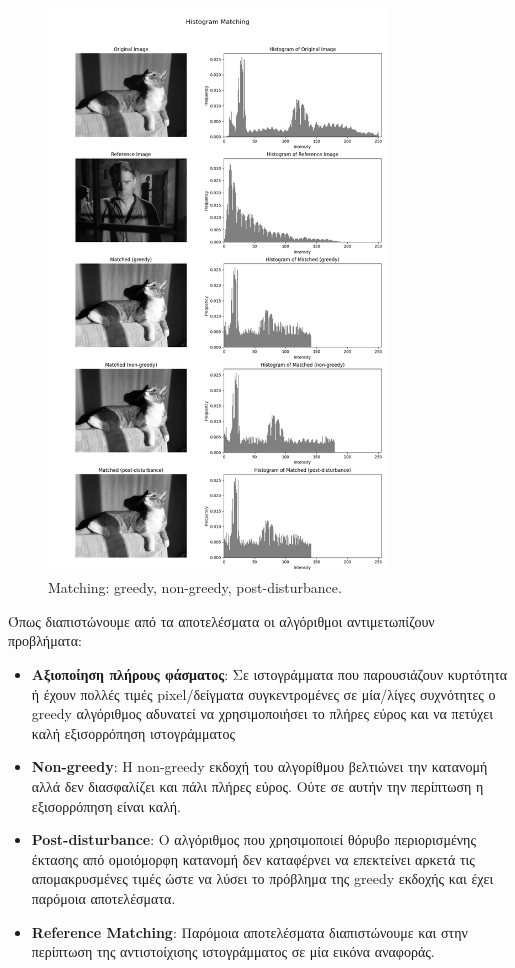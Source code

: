 \documentclass{article}
\begin{document}
\begin{figure}[H]
  \centering
  \includegraphics[width=0.8\textwidth]{histogram_matching_results.png}
  \caption{Matching: greedy, non-greedy, post-disturbance.}
  \label{fig:match}
\end{figure}

Όπως διαπιστώνουμε από τα αποτελέσματα οι αλγόριθμοι αντιμετωπίζουν προβλήματα:
\begin{itemize}
  \item \textbf{Αξιοποίηση πλήρους φάσματος}: Σε ιστογράμματα που παρουσιάζουν κυρτότητα ή έχουν πολλές τιμές pixel/δείγματα συγκεντρομένες σε μία/λίγες συχνότητες ο greedy αλγόριθμος αδυνατεί να χρησιμοποιήσει το πλήρες εύρος και να πετύχει καλή εξισορρόπηση ιστογράμματος
  \item \textbf{Non-greedy}: Η non-greedy εκδοχή του αλγορίθμου βελτιώνει την κατανομή αλλά δεν διασφαλίζει και πάλι πλήρες εύρος. Ούτε σε αυτήν την περίπτωση η εξισορρόπηση είναι καλή.
  \item \textbf{Post-disturbance}: Ο αλγόριθμος που χρησιμοποιεί θόρυβο περιορισμένης έκτασης από ομοιόμορφη κατανομή δεν καταφέρνει να επεκτείνει
  αρκετά τις απομακρυσμένες τιμές ώστε να λύσει το πρόβλημα της greedy εκδοχής και έχει παρόμοια αποτελέσματα.
  \item \textbf{Reference Matching}: Παρόμοια αποτελέσματα διαπιστώνουμε και στην περίπτωση της αντιστοίχισης ιστογράμματος σε μία εικόνα αναφοράς. 
\end{itemize}
\end{document}
